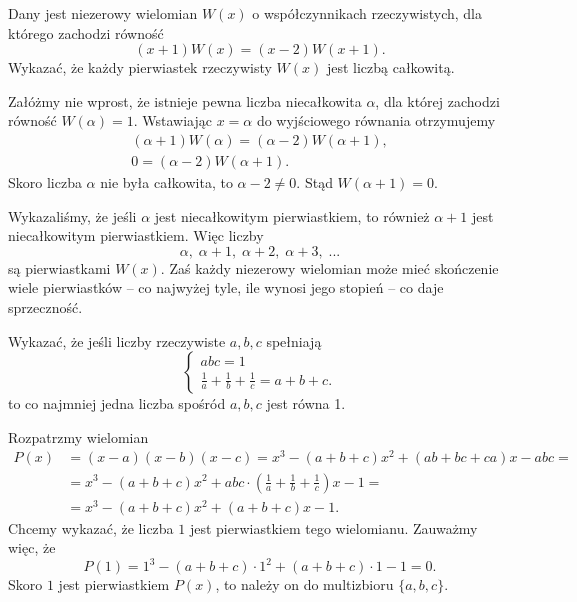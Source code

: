 \newpage
{}

\begin{problem}{1}
    Dany jest niezerowy wielomian $W(x)$ o współczynnikach rzeczywistych, dla którego zachodzi równość
    \[
        (x + 1)W(x) = (x - 2)W(x + 1).
    \]
    Wykazać, że każdy pierwiastek rzeczywisty $W(x)$ jest liczbą całkowitą.
\end{problem}

\noindent
Załóżmy nie wprost, że istnieje pewna liczba niecałkowita $\alpha$, dla której zachodzi równość $W(\alpha) = 1$. Wstawiając $x = \alpha$ do wyjściowego równania otrzymujemy
\begin{align*}
    (\alpha + 1)W(\alpha) = (\alpha - 2)W(\alpha + 1), \\
    0 = (\alpha - 2)W(\alpha + 1).
\end{align*}
Skoro liczba $\alpha$ nie była całkowita, to $\alpha - 2 \neq 0$. Stąd $W(\alpha + 1) = 0$.

\vspace{10 px}
\noindent
Wykazaliśmy, że jeśli $\alpha$ jest niecałkowitym pierwiastkiem, to również $\alpha + 1$ jest niecałkowitym pierwiastkiem. Więc liczby
\[
    \alpha, \; \alpha + 1, \; \alpha + 2, \; \alpha + 3, \; ...
\]
są pierwiastkami $W(x)$. Zaś każdy niezerowy wielomian może mieć skończenie wiele pierwiastków -- co najwyżej tyle, ile wynosi jego stopień -- co daje sprzeczność.


\begin{problem}{2}
    Wykazać, że jeśli liczby rzeczywiste $a, b, c$ spełniają
    \[
    \begin{cases}
        abc = 1 \\
        \frac{1}{a} + \frac{1}{b} + \frac{1}{c} = a + b + c.
    \end{cases}
    \]
    to co najmniej jedna liczba spośród $a, b, c$ jest równa 1.
\end{problem}

\noindent
Rozpatrzmy wielomian
\begin{align*}
    P(x) &= (x - a)(x - b)(x - c) = x^3 - (a + b + c)x^2 + (ab + bc + ca)x - abc = \\
    &= x^3 - (a + b + c)x^2 + abc \cdot \left(\frac{1}{a} + \frac{1}{b} + \frac{1}{c}\right)x - 1 = \\
    &= x^3 - (a + b + c)x^2 + (a + b + c)x - 1.
\end{align*}
Chcemy wykazać, że liczba $1$ jest pierwiastkiem tego wielomianu. Zauważmy więc, że
\[
    P(1) = 1^3 - (a + b + c) \cdot 1^2 + (a + b + c)\cdot 1 - 1 = 0.
\]
Skoro $1$ jest pierwiastkiem $P(x)$, to należy on do multizbioru $\{a, b, c\}$.

